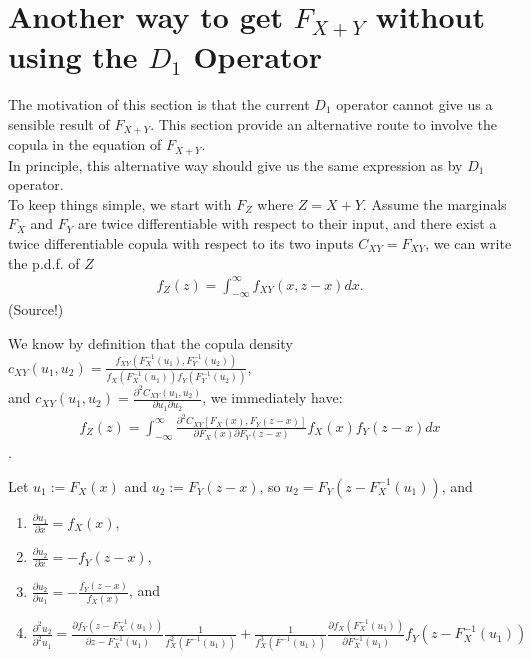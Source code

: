 \documentclass[11pt, leqno]{article}
\numberwithin{equation}{section}
\begin{document}
    \section{Another way to get $F_{X+Y}$ without using the $D_1$ Operator}\label{sec:D1alt}
The motivation of this section is that the current $D_1$ operator cannot give us a sensible result of $F_{X+Y}$.
This section provide an alternative route to involve the copula in the equation of $F_{X+Y}$.\\ \newline
    In principle, this alternative way should give us the same expression as by $D_1$ operator. \\ \newline
To keep things simple, we start with $F_Z$ where $Z = X+Y$.
    Assume the marginals $F_{X}$ and $F_{Y}$ are twice differentiable with respect to their input,
    and there exist a twice differentiable copula with respect to its two inputs $C_{XY} = F_{XY}$, we can write the p.d.f. of $Z$
    \begin{align}
    f_{Z}(z) = \int^\infty_{-\infty} f_{XY}(x, z-x)dx.
    \end{align} (Source!)

    We know by definition that the copula density $c_{XY}(u_1, u_2) = \frac{f_{XY}(F_X^{-1}(u_1), F_Y^{-1}(u_2))}{f_X(F_X^{-1}(u_1)) f_Y(F_Y^{-1}(u_2))}$,\\
    and $c_{XY}(u_1, u_2) = \frac{\partial^2 C_{XY}(u_1, u_2)}{\partial u_1 \partial u_2}$, we immediately have:
    \begin{align}
    f_{Z}(z) = \int^\infty_{-\infty} \label{eq:main}
    \frac{\partial^2 C_{XY}[F_X(x), F_Y(z-x)]}
         {\partial F_X(x) \partial F_Y(z-x)}f_X(x)f_Y(z-x)dx
    \end{align}.

    Let $u_1:=F_X(x)$ and $u_2:=F_Y(z-x)$, so $u_2=F_Y(z-F_X^{-1}(u_1))$, and
    \begin{enumerate}
        \item $\frac{\partial u_1}{\partial x}= f_X(x)$,
        \item $\frac{\partial u_2}{\partial x}= -f_Y(z-x)$,
        \item $\frac{\partial u_2}{\partial u_1} = -\frac{f_Y(z-x)}{f_X(x)}$, and
        \item $\frac{\partial^2 u_2}{\partial^2 u_1} =
                \frac{\partial f_Y(z-F^{-1}_X(u_1))}{\partial z - F_X^{-1}(u_1)}
                \frac{1}{f_X^2(F^{-1}(u_1))} +
                \frac{1}{f_X^3(F^{-1}(u_1))}\frac{\partial f_X(F^{-1}_X(u_1))}{\partial F_X^{-1}(u_1)}
                f_Y(z-F_X^{-1}(u_1))$
    \end{enumerate}
\end{document}
